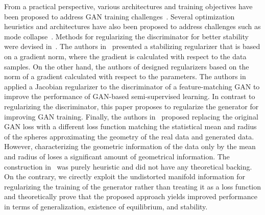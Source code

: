 \documentclass[10pt,twocolumn,letterpaper]{article}
\begin{document}
From a practical perspective, various architectures and training objectives have been proposed to address GAN training challenges~\cite{arjovsky2017wasserstein,poole2016improved,khayatkhoei2018disconnected}. Several optimization heuristics and architectures have also been proposed to address challenges such as mode collapse~\cite{salimans2016improved,unrolled,radford2015unsupervised,mode_reg}. Methods for regularizing the discriminator for better stability were devised in~\cite{roth,numerics,nagarajan2017gradient,lecouat2018semi}. The authors in~\cite{roth} presented a stabilizing regularizer that is based on a gradient norm, where the gradient is calculated with respect to the data samples. On the other hand, the authors of \cite{numerics,nagarajan2017gradient} designed regularizers based on the norm of a gradient calculated with respect to the parameters. The authors in \cite{lecouat2018semi} applied a Jacobian regularizer to the discriminator of a feature-matching GAN to improve the performance of GAN-based semi-supervised learning. In contrast to regularizing the discriminator, this paper proposes to regularize the generator for improving GAN training. Finally, the authors in~\cite{park2017mmgan} proposed replacing the original GAN loss with a different loss function matching the statistical mean and radius of the spheres approximating the geometry of the real data and generated data. However, characterizing the geometric information of the data only by the mean and radius of loses a significant amount of geometrical information. The construction in~\cite{park2017mmgan} was purely heuristic and did not have any theoretical backing. On the contrary, we cirectly exploit the undistorted manifold information for regularizing the training of the generator rather than treating it  as a loss function and theoretically prove that the proposed approach yields improved performance in terms of generalization, existence of equilibrium, and stability. 
\end{document}
